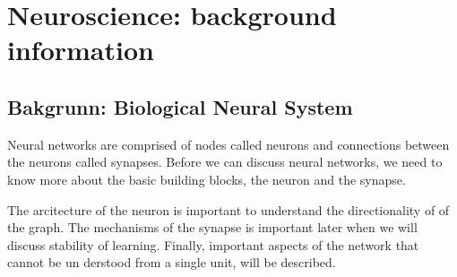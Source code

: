 








\chapter{Neuroscience: background information} %
\label{chapNeuroscience}


\section{Bakgrunn: Biological Neural System} 
\label{secTheBiologicalNeuralSystem}

Neural networks are comprised of nodes called neurons and connections between the neurons called synapses. 
Before we can discuss neural networks, we need to know more about the basic building blocks, the neuron and the synapse. 

The arcitecture of the neuron is important to understand the directionality of of the graph. %
	The mechanisms of the synapse is important later when we will discuss stability of learning. 
Finally, important aspects of the network that cannot be un derstood from a single unit, will be described.


